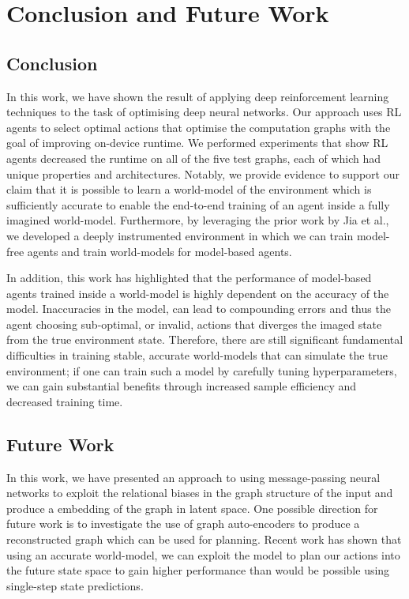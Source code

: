 \chapter{Conclusion and Future Work}

\section{Conclusion}

In this work, we have shown the result of applying deep reinforcement learning techniques to the task of optimising deep neural networks. Our approach uses RL agents to select optimal actions that optimise the computation graphs with the goal of improving on-device runtime. We performed experiments that show RL agents decreased the runtime on all of the five test graphs, each of which had unique properties and architectures. Notably, we provide evidence to support our claim that it is possible to learn a world-model of the environment which is sufficiently accurate to enable the end-to-end training of an agent inside a fully imagined world-model. Furthermore, by leveraging the prior work by Jia et al., we developed a deeply instrumented environment in which we can train model-free agents and train world-models for model-based agents.

In addition, this work has highlighted that the performance of model-based agents trained inside a world-model is highly dependent on the accuracy of the model. Inaccuracies in the model, can lead to compounding errors and thus the agent choosing sub-optimal, or invalid, actions that diverges the imaged state from the true environment state. Therefore, there are still significant fundamental difficulties in training stable, accurate world-models that can simulate the true environment; if one can train such a model by carefully tuning hyperparameters, we can gain substantial benefits through increased sample efficiency and decreased training time.

\section{Future Work}


In this work, we have presented an approach to using message-passing neural networks to exploit the relational biases in the graph structure of the input and produce a embedding of the graph in latent space. One possible direction for future work is to investigate the use of graph auto-encoders \cite{battaglia2018relational} to produce a reconstructed graph which can be used for planning. Recent work \cite{hafner2018learning, sekar2020planning} has shown that using an accurate world-model, we can exploit the model to plan our actions into the future state space to gain higher performance than would be possible using single-step state predictions.

